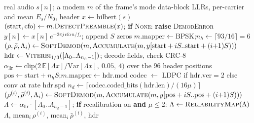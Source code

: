 \begin{algorithm}[H]
\caption{Float frame demodulation (\texttt{Transceiver.demod\_frame}), from detection to data LLRs.}
\label{alg:frame_demod}
\begin{algorithmic}[1]
\Require real audio $s[n]$; a modem $m$ of the frame's mode
\Ensure data-block LLRs, per-carrier and mean $E_s/N_0$, header
\State $x \gets \mathrm{hilbert}(s)$ 
\State $(\mathrm{start}, \mathrm{cfo}) \gets m.\textsc{DetectPreamble}(x)$; \textbf{if} \textsc{None}: \textbf{raise} \textsc{DemodError} \Comment{\S\ref{sec:zc}}
\State $y[n] \gets x[n]\, e^{-2\pi j\, \mathrm{cfo}\, n/f_s}$; append $S$ zeros 
\State $m.\mathrm{mapper} \gets \mathrm{BPSK}$;\quad $n_h \gets \lceil 93 / 16 \rceil = 6$ 
 
    \State $(\rho, \bar\rho, \Lambda_i) \gets \textsc{SoftDemod}(m, \textsc{Accumulate}(m, y[\mathrm{start} + iS .. \mathrm{start} + (i{+}1)S)))$
\EndFor
\State $\mathrm{hdr} \gets \textsc{Viterbi}_{1/3}([\Lambda_0 .. \Lambda_{n_h-1}])$; decode fields, check CRC-8 
\State $\alpha_{\mathrm{llr}} \gets \mathrm{clip}\big(2\,\mathbb{E}[\Lambda x]/\mathrm{Var}[\Lambda x],\ 0.05,\ 4\big)$ over the 96 header positions 
\State $\mathrm{pos} \gets \mathrm{start} + n_h S$;\quad $m.\mathrm{mapper} \gets \mathrm{hdr.mod}$
\State codec $\gets$ LDPC if $\mathrm{hdr.ver} = 2$ else conv at rate $\mathrm{hdr.spd}$
\State $n_d \gets \lceil \mathrm{codec.coded\_bits}(\mathrm{hdr.len}) / (16\mu) \rceil$
 
    \State $(\rho^{(i)}, \bar\rho^{(i)}, \Lambda_i) \gets \textsc{SoftDemod}(m, \textsc{Accumulate}(m, y[\mathrm{pos} + iS .. \mathrm{pos} + (i{+}1)S)))$
\EndFor
\State $\Lambda \gets \alpha_{\mathrm{llr}} \cdot [\Lambda_0 .. \Lambda_{n_d-1}]$; \textbf{if} recalibration on \textbf{and} $\mu \le 2$: $\Lambda \gets \textsc{ReliabilityMap}(\Lambda)$ \Comment{\S\ref{sec:llr}}
\State \Return $\Lambda$, $\mathrm{mean}_i\, \rho^{(i)}$, $\mathrm{mean}_i\, \bar\rho^{(i)}$, hdr
\end{algorithmic}
\end{algorithm}

